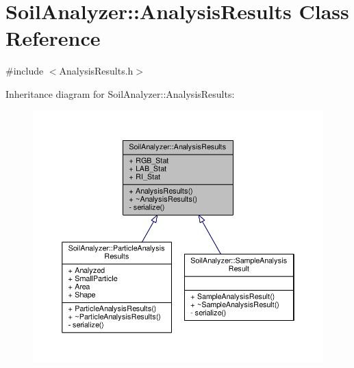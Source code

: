 \hypertarget{class_soil_analyzer_1_1_analysis_results}{}\section{Soil\+Analyzer\+:\+:Analysis\+Results Class Reference}
\label{class_soil_analyzer_1_1_analysis_results}


{\ttfamily \#include $<$Analysis\+Results.\+h$>$}



Inheritance diagram for Soil\+Analyzer\+:\+:Analysis\+Results\+:\nopagebreak
\begin{figure}[H]
\begin{center}
\leavevmode
\includegraphics[width=350pt]{class_soil_analyzer_1_1_analysis_results__inherit__graph}
\end{center}
\end{figure}


